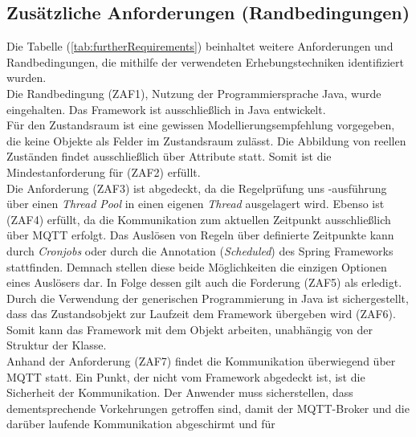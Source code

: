     \subsection*{Zusätzliche Anforderungen (Randbedingungen)}
        Die Tabelle (\ref{tab:furtherRequirements}) beinhaltet weitere Anforderungen und Randbedingungen, die mithilfe der verwendeten 
        Erhebungstechniken identifiziert wurden. 
        \\
        Die Randbedingung (ZAF1), Nutzung der Programmiersprache Java, wurde eingehalten. Das Framework ist ausschließlich in Java entwickelt. 
        \\
        Für den Zustandsraum ist eine gewissen Modellierungsempfehlung vorgegeben, die keine Objekte als Felder im Zustandsraum zulässt. Die 
        Abbildung von reellen Zuständen findet 
        ausschließlich über Attribute statt. Somit ist die Mindestanforderung für (ZAF2) erfüllt. 
        \\
        \linebreak
        Die Anforderung (ZAF3) ist abgedeckt, da die Regelprüfung uns -ausführung über einen \textit{Thread Pool} in einen eigenen \textit{Thread} ausgelagert wird. Ebenso 
        ist (ZAF4) erfüllt, da die Kommunikation zum aktuellen Zeitpunkt ausschließlich über \acs{MQTT} erfolgt. Das Auslösen von Regeln über definierte Zeitpunkte kann durch 
        \textit{Cronjobs} oder durch die Annotation (\textit{\@ Scheduled}) des Spring Frameworks stattfinden. Demnach stellen diese beide Möglichkeiten die einzigen Optionen eines 
        Auslösers dar. In Folge dessen gilt auch die Forderung (ZAF5) als erledigt.
        \\
        \linebreak
        Durch die Verwendung der generischen Programmierung in Java ist sichergestellt, dass das Zustandsobjekt zur Laufzeit dem Framework übergeben wird (ZAF6). %
        Somit kann das Framework mit dem Objekt arbeiten, unabhängig von der Struktur der Klasse.
        \\
        \linebreak
        Anhand der Anforderung (ZAF7) findet die Kommunikation überwiegend über \acs{MQTT} statt. Ein Punkt, der nicht vom Framework abgedeckt ist, ist die Sicherheit der 
        Kommunikation. Der Anwender muss sicherstellen, dass dementsprechende Vorkehrungen getroffen sind, damit der \acs{MQTT}-Broker und die darüber laufende Kommunikation abgeschirmt und für 
